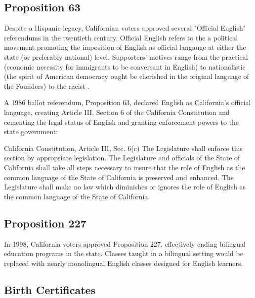 \subsection{Proposition 63}

Despite a Hispanic legacy, Californian voters approved several "Official
English" referendums in the twentieth century. Official English refers to the
a political movement promoting the imposition of English as official langauge at
either the state (or preferably national) level. Supporters' motives range from the
practical (economic necessity for immigrants to be conversant in
English) to nationalistic (the spirit of American democracy ought be cherished
in the original language of the Founders) to the racist \parencite[7]{baron92}.

A 1986 ballot referendum, Proposition 63, declared English as California's
official language, creating Article III, Section 6 of the California
Constitution and cementing the legal status of English and granting enforcement
powers to the state government: 

\begin{aquote}{California Constitution, Article III, Sec. 6(c)}
	The Legislature shall enforce this section by appropriate legislation. The
	Legislature and officials of the State of California shall take all steps
	necessary to insure that the role of English as the common language of the
	State of California is preserved and enhanced. The Legislature shall make no
	law which diminishes or ignores the role of English as the common language of
	the State of California. \parencite{ca-const}
\end{aquote}

\subsection{Proposition 227}

In 1998, California voters approved Proposition 227, effectively ending
bilingual education programs in the state. Classes taught in a bilingual setting
would be replaced with nearly monolingual English classes designed for English
learners.

\subsection{Birth Certificates}

